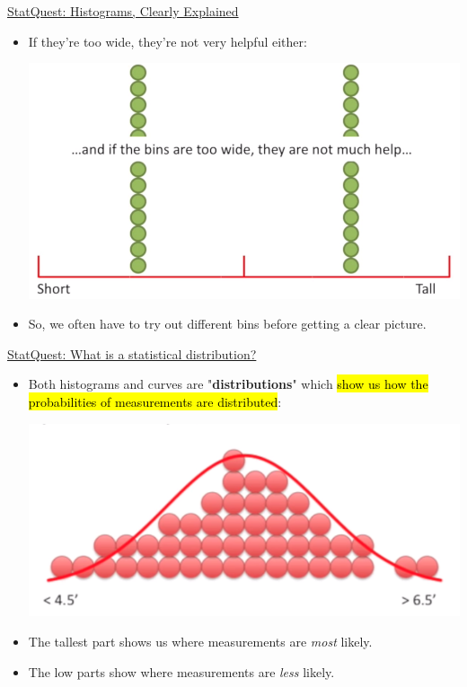 \documentclass[12pt, titlepage, french]{report}
\begin{document}
\begin{YTB_SUMM_AUTO_NUMB}[label = {SQ-histograms}]{\href{https://www.youtube.com/watch?v=qBigTkBLU6g}{StatQuest: Histograms, Clearly Explained}}
\begin{itemize}[leftmargin = *]
\begin{center}
		\end{center}
	\item	If they're too wide, they're not very helpful either:
		\begin{center}
		\includegraphics[scale=0.3]{src/SQ-HIST-BINS-WIDE.png}
		\end{center}
	\item	So, we often have to try out different bins before getting a clear picture.
\end{itemize}
\end{YTB_SUMM_AUTO_NUMB}

\begin{YTB_SUMM_AUTO_NUMB}[label = {SQ-stat-distr}]{\href{https://www.youtube.com/watch?v=oI3hZJqXJuc}{StatQuest: What is a statistical distribution?}}
\begin{itemize}[leftmargin = *]
	\item	Both histograms and curves are "\textbf{distributions}" which \hl{show us how the probabilities of measurements are distributed}:
		\begin{center}
		\includegraphics[scale=0.4]{src/SQ-STAT-DISTR-HIST-CURVE.png}
		\end{center}
	\item	The tallest part shows us where measurements are \textit{most} likely.
	\item	The low parts show where measurements are \textit{less} likely.
\end{itemize}
\end{YTB_SUMM_AUTO_NUMB}
\end{document}
